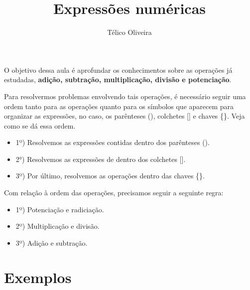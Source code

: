 \documentclass{article}
\title{Expressões numéricas}
\author{Télico Oliveira}
\begin{document}
\maketitle
O objetivo dessa aula é aprofundar os conhecimentos sobre as operações já estudadas, \textbf{adição, subtração, multiplicação, divisão e potenciação}. \cite{dante}

Para resolvermos problemas envolvendo tais operações, é necessário seguir uma ordem tanto para as operações quanto para os símbolos que aparecem para organizar as expressões, no caso, os parênteses (), colchetes [] e chaves \{\}. Veja como se dá essa ordem.
\begin{itemize}
    \item 1º) Resolvemos as expressões contidas dentro dos parênteses (). 
    \item 2°) Resolvemos as expressões de dentro dos colchetes []. 
    \item 3º) Por último, resolvemos as operações dentro das chaves \{\}.
\end{itemize}
Com relação à ordem das operações, precisamos seguir a seguinte regra: 
\begin{itemize}
    \item 1º) Potenciação e radiciação. 
    \item 2º) Multiplicação e divisão.
    \item 3º) Adição e subtração. 
\end{itemize}
\section{Exemplos}
\end{document}
